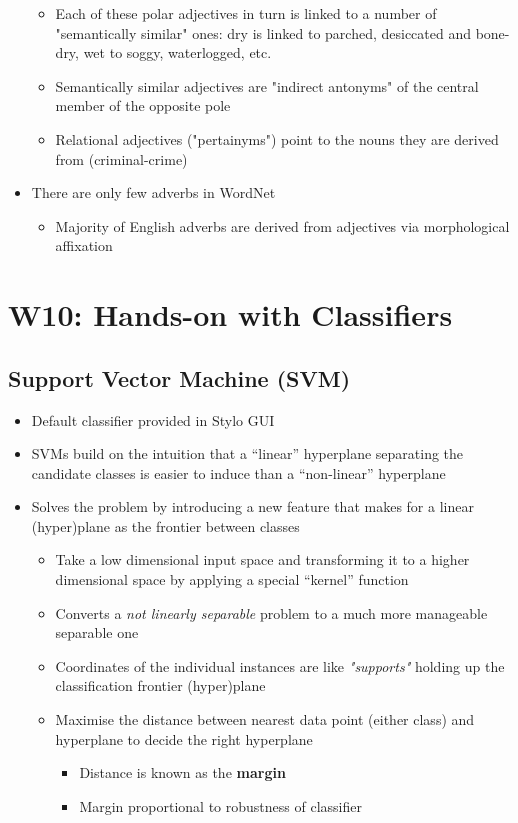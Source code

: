 \documentclass[a4paper]{article}
\begin{document}
\begin{itemize}
    \begin{itemize}[label=$\circ$]
        \item Each of these polar adjectives in turn is linked to a number of "semantically similar" ones: dry is linked to parched, desiccated and bone-dry, wet to soggy, waterlogged, etc.
        \item Semantically similar adjectives are "indirect antonyms" of the central member of the opposite pole
        \item Relational adjectives ("pertainyms") point to the nouns they are derived from (criminal-crime)
    \end{itemize}
    \item There are only few adverbs in WordNet
    \begin{itemize}[label=$\circ$]
        \item Majority of English adverbs are derived from adjectives via morphological affixation
    \end{itemize}
\end{itemize}

\newpage
\section{W10: Hands-on with Classifiers}
\subsection{Support Vector Machine (SVM)}
\begin{itemize}
    \item Default classifier provided in Stylo GUI
    \item SVMs build on the intuition that a ``linear'' hyperplane separating the candidate classes is easier to induce than a ``non-linear'' hyperplane
    \item Solves the problem by introducing a new feature that makes for a linear (hyper)plane as the frontier between classes
    \begin{itemize}[label=$\circ$]
        \item  Take a low dimensional input space and transforming it to a higher dimensional space by applying a special ``kernel'' function
        \item Converts a \textit{not linearly separable} problem to a much more manageable separable one
        \item Coordinates of the individual instances are like \textit{"supports"} holding up the classification frontier (hyper)plane
        \item Maximise the distance between nearest data point (either class) and hyperplane to decide the right hyperplane
        \begin{itemize}[label=\tiny$\blacksquare$]
            \item Distance is known as the \textbf{margin}
            \item Margin proportional to robustness of classifier
        \end{itemize}
    \end{itemize}
\end{itemize}
\end{document}
